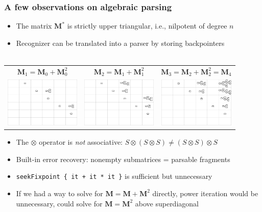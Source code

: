 \documentclass{beamer}
\begin{document}
    \begin{frame}
        \frametitle{A few observations on algebraic parsing}
        \begin{itemize}
            \item The matrix $\mathbf M^*$ is strictly upper triangular, i.e., nilpotent of degree $n$
            \item Recognizer can be translated into a parser by storing backpointers\\\\
        \end{itemize}\vspace{0.2cm}
        \begin{tabular}{ c c c }
            \small{$\mathbf{M}_1 = \mathbf{M}_0 + \mathbf{M}_0^2$} & \small{$\mathbf{M}_2 = \mathbf{M}_1 + \mathbf{M}_1^2$} & \small{$\mathbf{M}_3 = \mathbf{M}_2 + \mathbf{M}_2^2 = \mathbf{M}_4$} \\
            \includegraphics[trim=420 288 0 0,clip, width=3.6cm]{../figures/parse2.png} &
            \includegraphics[trim=420 285 0 0,clip, width=3.6cm]{../figures/parse3.png} &
            \includegraphics[trim=420 287 0 0,clip, width=3.63cm]{../figures/parse4.png}
        \end{tabular}
        \begin{itemize}
            \item The $\otimes$ operator is \textit{not} associative: $S \otimes (S \otimes S) \neq (S \otimes S) \otimes S$
            \item Built-in error recovery: nonempty submatrices = parsable fragments
            \item \texttt{seekFixpoint \{ it + it * it \}} is sufficient but unnecessary
            \item If we had a way to solve for $\mathbf{M = M + M}^2$ directly, power iteration would be unnecessary, could solve for $\mathbf{M = M}^2$ above superdiagonal
        \end{itemize}
    \end{frame}
\end{document}
